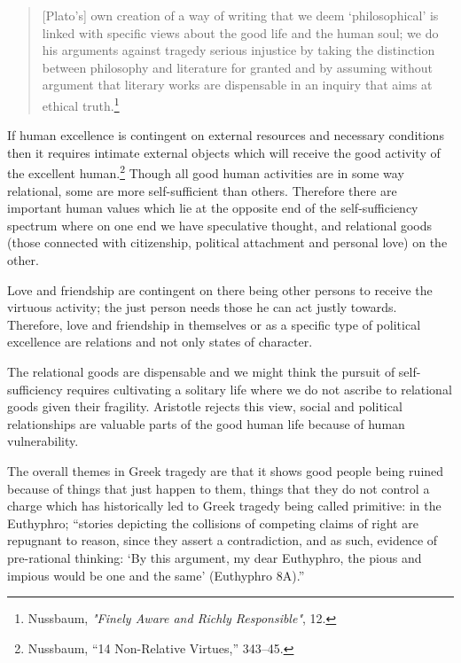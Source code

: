 \documentclass[phdthesis,12pt,final]{wuthesis}
\theoremstyle{definition}
\theoremstyle{definition}
\theoremstyle{definition}
\theoremstyle{definition}
\theoremstyle{remark}
\begin{document}
\begin{quote}
{[}Plato's{]} own creation of a way of writing that we deem `philosophical' is linked with specific views about the good life and the human soul; we do his arguments against tragedy serious injustice by taking the distinction between philosophy and literature for granted and by assuming without argument that literary works are dispensable in an inquiry that aims at ethical truth.\footnote{Nussbaum, \emph{"{Finely Aware} and {Richly Responsible}"}, 12.}
\end{quote}

If human excellence is contingent on external resources and necessary conditions then it requires intimate external objects which will receive the good activity of the excellent human.\footnote{Nussbaum, {``14 {Non-Relative Virtues},''} 343--45.} Though all good human activities are in some way relational, some are more self-sufficient than others. Therefore there are important human values which lie at the opposite end of the self-sufficiency spectrum where on one end we have speculative thought, and relational goods (those connected with citizenship, political attachment and personal love) on the other.

Love and friendship are contingent on there being other persons to receive the virtuous activity; the just person needs those he can act justly towards. Therefore, love and friendship in themselves or as a specific type of political excellence are relations and not only states of character.

The relational goods are dispensable and we might think the pursuit of self-sufficiency requires cultivating a solitary life where we do not ascribe to relational goods given their fragility. Aristotle rejects this view, social and political relationships are valuable parts of the good human life because of human vulnerability.

The overall themes in Greek tragedy are that it shows good people being ruined because of things that just happen to them, things that they do not control a charge which has historically led to Greek tragedy being called primitive: in the Euthyphro; ``stories depicting the collisions of competing claims of right are repugnant to reason, since they assert a contradiction, and as such, evidence of pre-rational thinking: `By this argument, my dear Euthyphro, the pious and impious would be one and the same' (Euthyphro 8A).''
\end{document}
